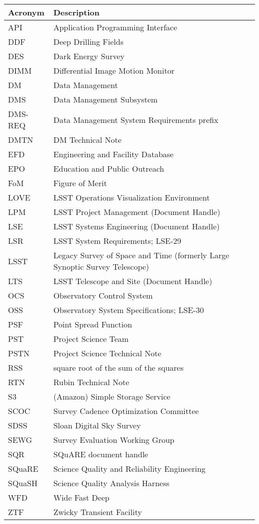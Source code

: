 \addtocounter{table}{-1}
\begin{longtable}{p{}p{}}\hline
\textbf{Acronym} & \textbf{Description}  \\\hline

API & Application Programming Interface \\\hline
DDF & Deep Drilling Fields \\\hline
DES & Dark Energy Survey \\\hline
DIMM & Differential Image Motion Monitor \\\hline
DM & Data Management \\\hline
DMS & Data Management Subsystem \\\hline
DMS-REQ & Data Management System Requirements prefix \\\hline
DMTN & DM Technical Note \\\hline
EFD & Engineering and Facility Database \\\hline
EPO & Education and Public Outreach \\\hline
FoM & Figure of Merit \\\hline
LOVE & LSST Operations Visualization Environment \\\hline
LPM & LSST Project Management (Document Handle) \\\hline
LSE & LSST Systems Engineering (Document Handle) \\\hline
LSR & LSST System Requirements; LSE-29 \\\hline
LSST & Legacy Survey of Space and Time (formerly Large Synoptic Survey Telescope) \\\hline
LTS & LSST Telescope and Site  (Document Handle) \\\hline
OCS & Observatory Control System \\\hline
OSS & Observatory System Specifications; LSE-30 \\\hline
PSF & Point Spread Function \\\hline
PST & Project Science Team \\\hline
PSTN & Project Science Technical Note \\\hline
RSS & square root of the sum of the squares \\\hline
RTN & Rubin Technical Note \\\hline
S3 & (Amazon) Simple Storage Service  \\\hline
SCOC & Survey Cadence Optimization Committee \\\hline
SDSS & Sloan Digital Sky Survey \\\hline
SEWG & Survey Evaluation Working Group \\\hline
SQR & SQuARE document handle \\\hline
SQuaRE & Science Quality and Reliability Engineering \\\hline
SQuaSH & Science Quality Analysis Harness \\\hline
WFD & Wide Fast Deep \\\hline
ZTF & Zwicky Transient Facility \\\hline
\end{longtable}
